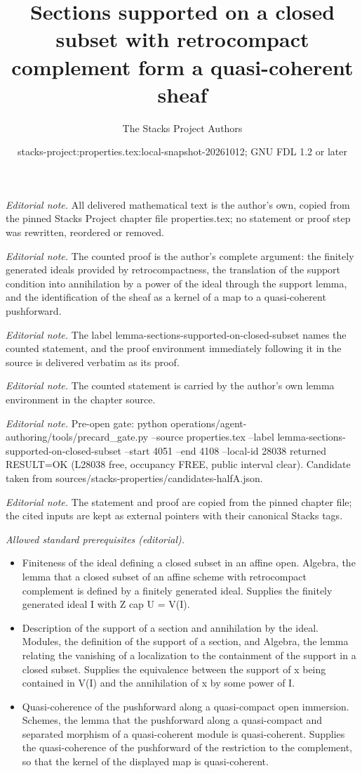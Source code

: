 \documentclass[10pt,a4paper]{amsart}
\title{Sections supported on a closed subset with retrocompact complement form a quasi-coherent sheaf}
\author{The Stacks Project Authors}
\date{stacks-project:properties.tex:local-snapshot-20261012; GNU FDL 1.2 or later}
\theoremstyle{plain}
\theoremstyle{definition}
\theoremstyle{remark}
\numberwithin{equation}{subsection}
\begin{document}
\maketitle
\noindent\textit{Editorial note.} All delivered mathematical text is the author's own, copied from the pinned Stacks Project chapter file properties.tex; no statement or proof step was rewritten, reordered or removed.\par\medskip
\noindent\textit{Editorial note.} The counted proof is the author's complete argument: the finitely generated ideals provided by retrocompactness, the translation of the support condition into annihilation by a power of the ideal through the support lemma, and the identification of the sheaf as a kernel of a map to a quasi-coherent pushforward.\par\medskip
\noindent\textit{Editorial note.} The label lemma-sections-supported-on-closed-subset names the counted statement, and the proof environment immediately following it in the source is delivered verbatim as its proof.\par\medskip
\noindent\textit{Editorial note.} The counted statement is carried by the author's own lemma environment in the chapter source.\par\medskip
\noindent\textit{Editorial note.} Pre-open gate: python operations/agent-authoring/tools/precard\_gate.py --source properties.tex --label lemma-sections-supported-on-closed-subset --start 4051 --end 4108 --local-id 28038 returned RESULT=OK (L28038 free, occupancy FREE, public interval clear). Candidate taken from sources/stacks-properties/candidates-halfA.json.\par\medskip
\noindent\textit{Editorial note.} The statement and proof are copied from the pinned chapter file; the cited inputs are kept as external pointers with their canonical Stacks tags.\par\medskip
\noindent\textit{Allowed standard prerequisites (editorial).}\begin{itemize}
\item Finiteness of the ideal defining a closed subset in an affine open. Algebra, the lemma that a closed subset of an affine scheme with retrocompact complement is defined by a finitely generated ideal. Supplies the finitely generated ideal I with Z cap U = V(I).
\item Description of the support of a section and annihilation by the ideal. Modules, the definition of the support of a section, and Algebra, the lemma relating the vanishing of a localization to the containment of the support in a closed subset. Supplies the equivalence between the support of x being contained in V(I) and the annihilation of x by some power of I.
\item Quasi-coherence of the pushforward along a quasi-compact open immersion. Schemes, the lemma that the pushforward along a quasi-compact and separated morphism of a quasi-coherent module is quasi-coherent. Supplies the quasi-coherence of the pushforward of the restriction to the complement, so that the kernel of the displayed map is quasi-coherent.
\end{itemize}\medskip
\end{document}

